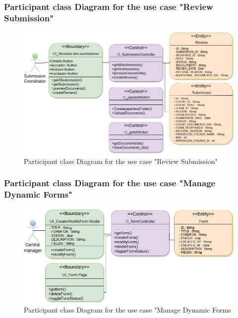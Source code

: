 \subsubsection{Participant class Diagram for the use case "Review Submission"}
 \begin{figure}[h!]
    \centering
    \includegraphics[width=1\textwidth]{figures/dc review submission.png}
    \caption{Participant class Diagram for the use case "Review Submission"}
\end{figure}

\subsubsection{Participant class Diagram for the use case "Manage Dynamic Forms"}
 \begin{figure}[h!]
    \centering
    \includegraphics[width=1\textwidth]{figures/dc manageform.png}
    \caption{Participant class Diagram for the use case "Manage Dynamic Forms}
\end{figure}
\clearpage

